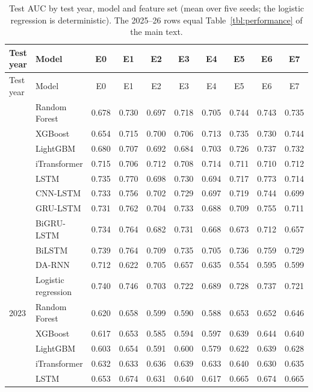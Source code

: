 \begin{footnotesize}
\setlength{\tabcolsep}{4pt}
\begin{longtable}{@{} l l cccccccc @{}}
\caption{Test AUC by test year, model and feature set (mean over five seeds; the logistic regression is deterministic). The 2025--26 rows equal Table~\ref{tbl:performance} of the main text.}
\label{tbl:expanding_origin_auc}\\
\toprule
Test year & Model & E0 & E1 & E2 & E3 & E4 & E5 & E6 & E7 \\
\midrule
\endfirsthead
\toprule
Test year & Model & E0 & E1 & E2 & E3 & E4 & E5 & E6 & E7 \\
\midrule
\endhead
\bottomrule
\endlastfoot
2022 & Random Forest & 0.678 & 0.730 & 0.697 & 0.718 & 0.705 & 0.744 & 0.743 & 0.735 \\
 & XGBoost & 0.654 & 0.715 & 0.700 & 0.706 & 0.713 & 0.735 & 0.730 & 0.744 \\
 & LightGBM & 0.680 & 0.707 & 0.692 & 0.684 & 0.703 & 0.726 & 0.737 & 0.732 \\
 & iTransformer & 0.715 & 0.706 & 0.712 & 0.708 & 0.714 & 0.711 & 0.710 & 0.712 \\
 & LSTM & 0.735 & 0.770 & 0.698 & 0.730 & 0.694 & 0.717 & 0.773 & 0.714 \\
 & CNN-LSTM & 0.733 & 0.756 & 0.702 & 0.729 & 0.697 & 0.719 & 0.744 & 0.699 \\
 & GRU-LSTM & 0.731 & 0.762 & 0.704 & 0.733 & 0.688 & 0.709 & 0.755 & 0.711 \\
 & BiGRU-LSTM & 0.734 & 0.764 & 0.682 & 0.731 & 0.668 & 0.673 & 0.712 & 0.657 \\
 & BiLSTM & 0.739 & 0.764 & 0.709 & 0.735 & 0.705 & 0.736 & 0.759 & 0.729 \\
 & DA-RNN & 0.712 & 0.622 & 0.705 & 0.657 & 0.635 & 0.554 & 0.595 & 0.599 \\
 & Logistic regression & 0.740 & 0.746 & 0.703 & 0.722 & 0.689 & 0.728 & 0.737 & 0.721 \\
\midrule
2023 & Random Forest & 0.620 & 0.658 & 0.599 & 0.590 & 0.588 & 0.653 & 0.652 & 0.646 \\
 & XGBoost & 0.617 & 0.653 & 0.585 & 0.594 & 0.597 & 0.639 & 0.644 & 0.640 \\
 & LightGBM & 0.603 & 0.654 & 0.591 & 0.600 & 0.579 & 0.622 & 0.639 & 0.628 \\
 & iTransformer & 0.632 & 0.633 & 0.636 & 0.639 & 0.633 & 0.640 & 0.630 & 0.635 \\
 & LSTM & 0.653 & 0.674 & 0.631 & 0.640 & 0.617 & 0.665 & 0.674 & 0.665 \\

\end{longtable}
\end{footnotesize}
